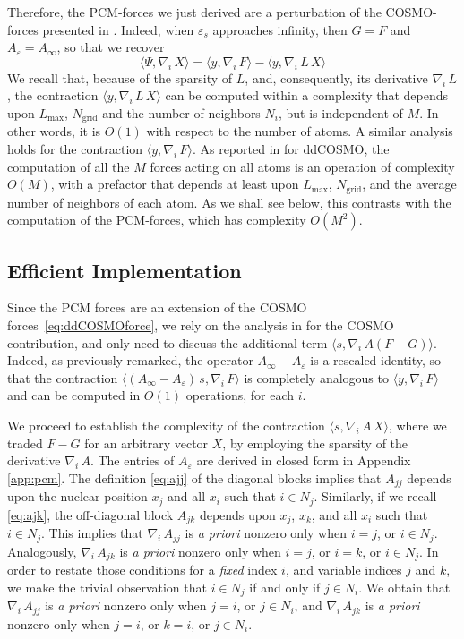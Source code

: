 \documentclass[aip,jcp,a4paper,11pt]{revtex4-1}
\newcommand{\nablai}{\nabla_{\!i}\,}
\begin{document}
Therefore, the PCM-forces we just derived are a perturbation of the COSMO-forces presented in \cite{Lipparini_JCTC_ddCOSMO}. Indeed, when $\varepsilon_s$ approaches infinity, then $G = F$ and $A_\varepsilon = {A_\infty} $, so that we recover
\begin{equation}
	\label{eq:ddCOSMOforce}
	\langle \Psi , \nablai X\rangle =  \langle y , \nablai F \rangle - \langle y , \nablai L \,  X \rangle
\end{equation}
We recall that, because of the sparsity of $L$, and, consequently, its derivative $\nablai L$, the contraction $\langle y ,\nablai L \, X\rangle$ can be computed within a complexity that depends upon $L_\text{max}$, $N_\text{grid}$ and the number of neighbors $N_i$, but is independent of $M$. In other words, it is $O(1)$ with respect to the number of atoms. A similar analysis holds for the contraction $\langle y , \nablai F \rangle$. As reported in \cite{Lipparini_JCTC_ddCOSMO} for ddCOSMO, the computation of all the $M$ forces acting on all atoms is an operation of complexity $O(M)$, with a prefactor that depends at least upon $L_\text{max}$, $N_\text{grid}$, and the average number of neighbors of each atom. As we shall see below, this contrasts with the computation of the PCM-forces, which has complexity $O(M^2)$.

\subsection{Efficient Implementation}

Since the PCM forces are an extension of the COSMO forces~\eqref{eq:ddCOSMOforce}, we rely on the analysis in \cite{Lipparini_JCTC_ddCOSMO} for the COSMO contribution, and only need to discuss the additional term $\langle s , \nablai  A ( F - G ) \rangle$. Indeed, as previously remarked, the operator ${A_\infty} -{A_\varepsilon}$ is a rescaled identity, so that the contraction $\langle ({A_\infty}-{A_\varepsilon})\, s, \nablai F \rangle$ is completely analogous to $\langle y , \nablai F \rangle$ and can be computed in $O(1)$ operations, for each $i$.
 
 
We proceed to establish the complexity of the contraction $\langle s , \nablai  A\, X \rangle$, where we traded $F-G$ for an arbitrary vector $X$, by employing the sparsity of the derivative $\nablai A$. The entries of $A_\varepsilon$ are derived in closed form in Appendix \ref{app:pcm}. The definition \eqref{eq:ajj} of the diagonal blocks implies that $A_{jj}$ depends upon the nuclear position $x_j$ and all $x_i$ such that $i \in N_j$. Similarly, if we recall \eqref{eq:ajk}, the off-diagonal block $A_{jk}$ depends upon $x_j$, $x_k$, and all $x_i$ such that $i \in N_j$. This implies that $\nablai A_{jj}$ is \emph{a priori} nonzero only when $i = j$, or $i \in N_j$. Analogously, $\nablai A_{jk}$ is \emph{a priori} nonzero only when $i = j$, or $i = k$, or $i \in N_j$. In order to restate those conditions for a \emph{fixed} index $i$, and variable indices $j$ and $k$, we make the trivial observation that $i \in N_j$ if and only if $j \in N_i$. We obtain that $\nablai A_{jj}$ is \emph{a priori} nonzero only when $j = i$, or $j \in N_i$, and $\nablai A_{jk}$ is \emph{a priori} nonzero only when $j= i$, or $k = i$, or $j \in N_i$.
\end{document}
